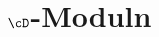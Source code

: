 
\section{$\cD$-Moduln}

\begin{comment}

  \subsection{Lokalisierung eines $\C\{x\}$-Moduls}

  \begin{defn}
    Sei $M$ ein $\C\{x\}$-Modul und $K=\C\{x\}[x^{-1}]$, dann ist die
    Lokalisierung
    \[ M[x^{-1}]:=M\otimes_{\C\{x\}}K \,. \]
  \end{defn}

  \subsection{Lokalisierung eines holonomen $\cD$-Moduls}
\end{comment}

